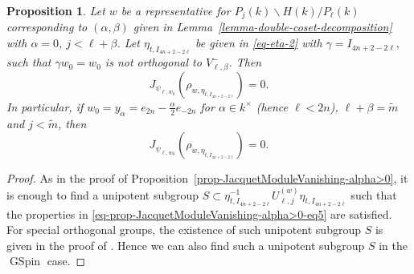 \documentclass[12pt]{amsart}
\newcommand{\wt}{\widetilde}
\newtheorem{proposition}[theorem]{Proposition}%
\theoremstyle{remark}
\DeclareMathOperator{\GSpin}{GSpin}
\begin{document}
\begin{proposition}
\label{prop-JacquetModuleVanishing-alpha=0}
Let $w$ be a representative for $P_j(k)\backslash H(k)/P_\ell(k)$ corresponding to $(\alpha, \beta)$ given in Lemma~\ref{lemma-double-coset-decomposition} with $\alpha=0$, $j<\ell+\beta$. Let $\eta_{t, I_{4n+2-2\ell}}$ be given in \eqref{eq-eta-2} with $\gamma=I_{4n+2-2\ell},$ such that $\gamma w_0=w_0$ is not orthogonal to $V_{\ell,\beta}^-$. Then 
\begin{equation*}
J_{\psi_{\ell, w_0}}(\rho_{w,\eta_{t,I_{4n+2-2\ell}}})=0.	
\end{equation*}
In particular, if $w_0=y_\alpha=e_{2n}-\frac{\alpha}{2}e_{-2n}$ for $\alpha\in k^\times$ (hence $\ell<2n$), $\ell+\beta=\wt m$ and $j<\wt m$, then 
\begin{equation*}
J_{\psi_{\ell, w_0}}(\rho_{w,\eta_{t,I_{4n+2-2\ell}}})=0.	
\end{equation*}
\end{proposition}

\begin{proof}
As in the proof of Proposition~\ref{prop-JacquetModuleVanishing-alpha>0}, it is enough to find a unipotent subgroup $S\subset \eta_{t, I_{4n+2-2\ell}}^{-1} U_{\ell, j}^{(w)} \eta_{t, I_{4n+2-2\ell}}$ such that the properties in  \eqref{eq-prop-JacquetModuleVanishing-alpha>0-eq5} are satisfied. For special orthogonal groups, the existence of such unipotent subgroup $S$ is given in the proof of \cite[Proposition 5.2]{GinzburgRallisSoudry2011}. Hence we can also find such a unipotent subgroup $S$ in the $\GSpin$ case. 
\end{proof}
\end{document}
